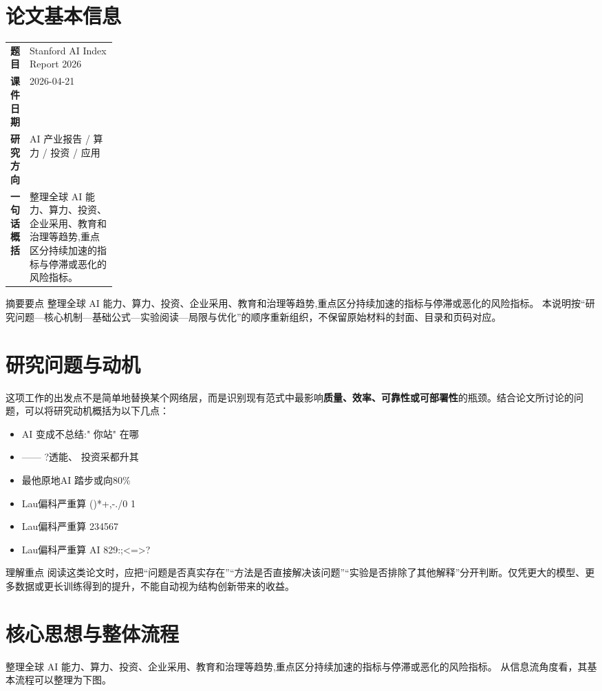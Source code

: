 \documentclass[UTF8,11pt,a4paper]{ctexart}
\newcommand{\term}[1]{\textbf{\textcolor{mainblue}{#1}}}
\begin{document}
\section{论文基本信息}
\begin{center}
\begin{tabularx}{0.94\linewidth}{>{\bfseries}p{0.18\linewidth}X}
\toprule
题目 & Stanford AI Index Report 2026\\
课件日期 & 2026-04-21\\
研究方向 & AI 产业报告 / 算力 / 投资 / 应用\\
一句话概括 & 整理全球 AI 能力、算力、投资、企业采用、教育和治理等趋势,重点区分持续加速的指标与停滞或恶化的风险指标。\\
\bottomrule
\end{tabularx}
\end{center}

\begin{infobox}{摘要要点}
整理全球 AI 能力、算力、投资、企业采用、教育和治理等趋势,重点区分持续加速的指标与停滞或恶化的风险指标。 本说明按“研究问题—核心机制—基础公式—实验阅读—局限与优化”的顺序重新组织，不保留原始材料的封面、目录和页码对应。
\end{infobox}

\section{研究问题与动机}
这项工作的出发点不是简单地替换某个网络层，而是识别现有范式中最影响\term{质量、效率、可靠性或可部署性}的瓶颈。结合论文所讨论的问题，可以将研究动机概括为以下几点：
\begin{itemize}
\item AI 变成不总结:" 你站" 在哪
\item —— ?透能、 投资采都升其
\item 最他原地AI 踏步或向80\%
\item Lau偏科严重算 ()*+,-./0 1
\item Lau偏科严重算 234567
\item Lau偏科严重算 AI 829:;<=>?
\end{itemize}

\begin{notebox}{理解重点}
阅读这类论文时，应把“问题是否真实存在”“方法是否直接解决该问题”“实验是否排除了其他解释”分开判断。仅凭更大的模型、更多数据或更长训练得到的提升，不能自动视为结构创新带来的收益。
\end{notebox}

\section{核心思想与整体流程}
整理全球 AI 能力、算力、投资、企业采用、教育和治理等趋势,重点区分持续加速的指标与停滞或恶化的风险指标。 从信息流角度看，其基本流程可以整理为下图。
\end{document}
